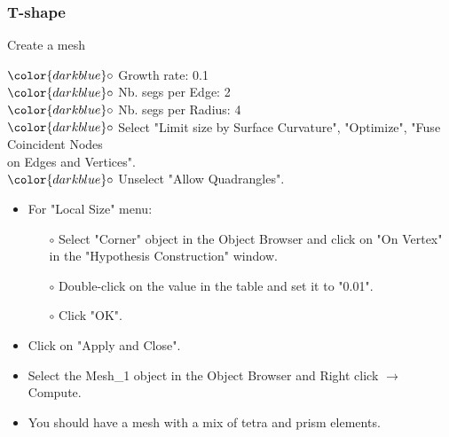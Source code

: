 \documentclass[10pt]{beamer}
\begin{document}
\begin{frame}
\frametitle{T-shape}
\begin{block}{Create a mesh}

\hspace{1cm} $\color{darkblue}\circ$ {\small{Growth rate: 0.1}}\\
\hspace{1cm} $\color{darkblue}\circ$ {\small{Nb. segs per Edge: 2}}\\
\hspace{1cm} $\color{darkblue}\circ$ {\small{Nb. segs per Radius: 4}}\\
\hspace{1cm} $\color{darkblue}\circ$ {\small{Select "Limit size by Surface Curvature", "Optimize", "Fuse Coincident Nodes \\
\hspace{1,3cm} on Edges and Vertices".}}\\
\hspace{1cm} $\color{darkblue}\circ$ {\small{Unselect "Allow Quadrangles".}}\\

\begin{itemize}
\item For "Local Size" menu:
    \begin{itemize}
    \item [$\circ$] Select "Corner" object in the Object Browser and click on "On Vertex" in the "Hypothesis Construction" window.
    \item [$\circ$] Double-click on the value in the table and set it to "0.01".
    \item [$\circ$] Click "OK".
    \end{itemize}
\item Click on "Apply and Close".
\item Select the Mesh\_1 object in the Object Browser and Right click $\rightarrow$ Compute.
\item You should have a mesh with a mix of tetra and prism elements.

\end{itemize}

\end{block}
\end{frame}
\end{document}
